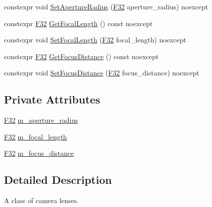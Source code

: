 \begin{DoxyCompactItemize}
\item 
constexpr void \mbox{\hyperlink{classmage_1_1rendering_1_1_camera_lens_aeaf06e7e7ee0fadda24123b9f457312d}{Set\+Aperture\+Radius}} (\mbox{\hyperlink{namespacemage_aa97e833b45f06d60a0a9c4fc22ae02c0}{F32}} aperture\+\_\+radius) noexcept
\item 
constexpr \mbox{\hyperlink{namespacemage_aa97e833b45f06d60a0a9c4fc22ae02c0}{F32}} \mbox{\hyperlink{classmage_1_1rendering_1_1_camera_lens_a3372be41a251db2a691a84a6413d7ac9}{Get\+Focal\+Length}} () const noexcept
\item 
constexpr void \mbox{\hyperlink{classmage_1_1rendering_1_1_camera_lens_ad954dd19be6f0cc54c74aecf29bb2134}{Set\+Focal\+Length}} (\mbox{\hyperlink{namespacemage_aa97e833b45f06d60a0a9c4fc22ae02c0}{F32}} focal\+\_\+length) noexcept
\item 
constexpr \mbox{\hyperlink{namespacemage_aa97e833b45f06d60a0a9c4fc22ae02c0}{F32}} \mbox{\hyperlink{classmage_1_1rendering_1_1_camera_lens_aaca19c16506a65b2cb66ca6de737c712}{Get\+Focus\+Distance}} () const noexcept
\item 
constexpr void \mbox{\hyperlink{classmage_1_1rendering_1_1_camera_lens_ae2ea1ae80e1eb3734d81dcf6d0a127d3}{Set\+Focus\+Distance}} (\mbox{\hyperlink{namespacemage_aa97e833b45f06d60a0a9c4fc22ae02c0}{F32}} focus\+\_\+distance) noexcept
\end{DoxyCompactItemize}
\subsection*{Private Attributes}
\begin{DoxyCompactItemize}
\item 
\mbox{\hyperlink{namespacemage_aa97e833b45f06d60a0a9c4fc22ae02c0}{F32}} \mbox{\hyperlink{classmage_1_1rendering_1_1_camera_lens_a50f361ad01d0b35fdc46086de720ebd8}{m\+\_\+aperture\+\_\+radius}}
\item 
\mbox{\hyperlink{namespacemage_aa97e833b45f06d60a0a9c4fc22ae02c0}{F32}} \mbox{\hyperlink{classmage_1_1rendering_1_1_camera_lens_a3459fd7d208a7ad8f1cf01718e008e36}{m\+\_\+focal\+\_\+length}}
\item 
\mbox{\hyperlink{namespacemage_aa97e833b45f06d60a0a9c4fc22ae02c0}{F32}} \mbox{\hyperlink{classmage_1_1rendering_1_1_camera_lens_a3d2da4f61425500a51171b19e4a03769}{m\+\_\+focus\+\_\+distance}}
\end{DoxyCompactItemize}


\subsection{Detailed Description}
A class of camera lenses. 

